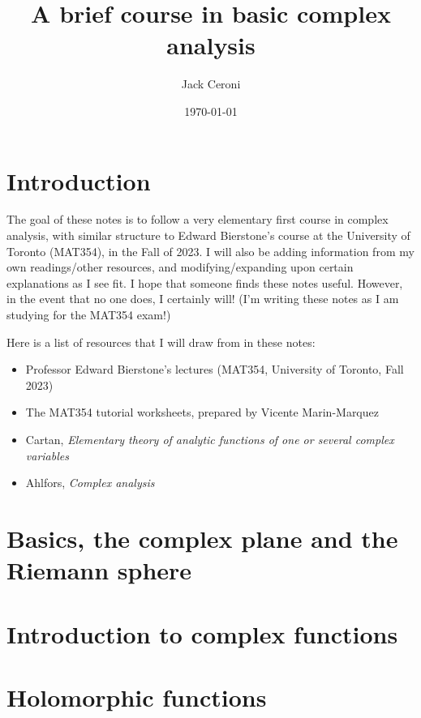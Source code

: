 \documentclass[aps,pra,showpacs,notitlepage,onecolumn,superscriptaddress,nofootinbib]{revtex4-1}
\theoremstyle{definition}
\begin{document}
\title{A brief course in basic complex analysis}
\author{Jack Ceroni}

\date{\today}

\maketitle

\tableofcontents

\section{Introduction}

\noindent The goal of these notes is to follow a very elementary first course in complex analysis, with similar structure to Edward Bierstone's course at the University of Toronto (MAT354), in the Fall of 2023. I will
also be adding information from my own readings/other resources, and modifying/expanding upon certain explanations as I see fit. I hope that someone finds these notes useful. However, in the event that no one does, I certainly will!
(I'm writing these notes as I am studying for the MAT354 exam!)

Here is a list of resources that I will draw from in these notes:

\begin{itemize}
\item Professor Edward Bierstone's lectures (MAT354, University of Toronto, Fall 2023)
\item The MAT354 tutorial worksheets, prepared by Vicente Marin-Marquez
  \item Cartan, \textit{Elementary theory of analytic functions of one or several complex variables}
  \item Ahlfors, \textit{Complex analysis}
\end{itemize}

\section{Basics, the complex plane and the Riemann sphere}

\section{Introduction to complex functions}

\section{Holomorphic functions}
\end{document}
